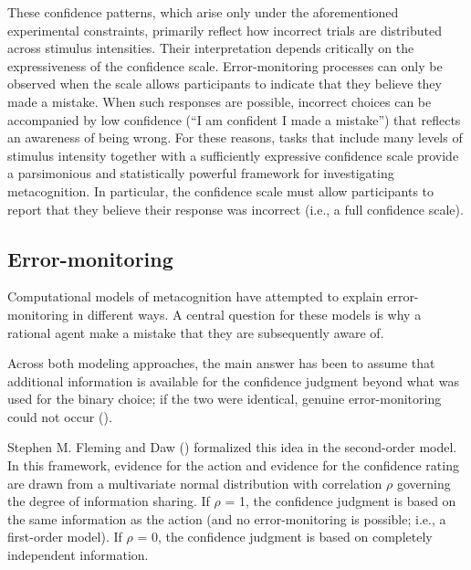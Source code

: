 \documentclass[
]{article}
\begin{document}
These confidence patterns, which arise only under the aforementioned
experimental constraints, primarily reflect how incorrect trials are
distributed across stimulus intensities. Their interpretation depends
critically on the expressiveness of the confidence scale.
Error-monitoring processes can only be observed when the scale allows
participants to indicate that they believe they made a mistake. When
such responses are possible, incorrect choices can be accompanied by low
confidence (``I am confident I made a mistake'') that reflects an
awareness of being wrong. For these reasons, tasks that include many
levels of stimulus intensity together with a sufficiently expressive
confidence scale provide a parsimonious and statistically powerful
framework for investigating metacognition. In particular, the confidence
scale must allow participants to report that they believe their response
was incorrect (i.e., a full confidence scale).

\subsection{Error-monitoring}\label{error-monitoring}

Computational models of metacognition have attempted to explain
error-monitoring in different ways. A central question for these models
is why a rational agent make a mistake that they are subsequently aware
of.

Across both modeling approaches, the main answer has been to assume that
additional information is available for the confidence judgment beyond
what was used for the binary choice; if the two were identical, genuine
error-monitoring could not occur
().

Stephen M. Fleming and Daw
()
formalized this idea in the second-order model. In this framework,
evidence for the action and evidence for the confidence rating are drawn
from a multivariate normal distribution with correlation \(\rho\)
governing the degree of information sharing. If \(\rho\) = 1, the
confidence judgment is based on the same information as the action (and
no error-monitoring is possible; i.e., a first-order model). If \(\rho\)
= 0, the confidence judgment is based on completely independent
information.
\end{document}
